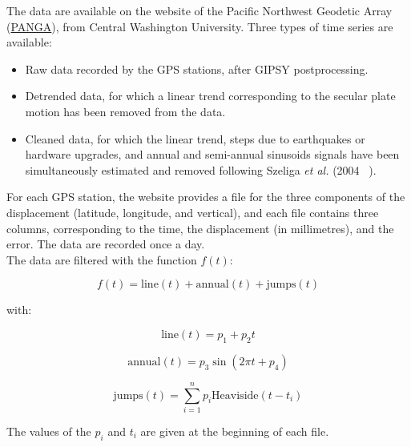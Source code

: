 \documentclass[main.tex]{subfiles}
\begin{document}
The data are available on the website of the Pacific Northwest Geodetic Array (\href{http://www.geodesy.cwu.edu/}{PANGA}), from Central Washington University. Three types of time series are available:

\begin{itemize}
\item Raw data recorded by the GPS stations, after GIPSY postprocessing.
\item Detrended data, for which a linear trend corresponding to the secular plate motion has been removed from the data.
\item Cleaned data, for which the linear trend, steps due to earthquakes or hardware upgrades, and annual and semi-annual sinusoids signals have been simultaneously estimated and removed following Szeliga \textit{et al.} (2004 ~\cite{SZE_2004}).
\end{itemize}

For each GPS station, the website provides a file for the three components of the displacement (latitude, longitude, and vertical), and each file contains three columns, corresponding to the time, the displacement (in millimetres), and the error. The data are recorded once a day. \\

The data are filtered with the function $f (t)$:

\begin{equation}
f (t) = \textrm{line} (t) + \textrm{annual} (t) + \textrm{jumps} (t)
\end{equation}

with:

\begin{equation}
\textrm{line} (t) = p_1 + p_2 t
\end{equation}

\begin{equation}
\textrm{annual} (t) = p_3 \sin (2 \pi t + p_4)
\end{equation}

\begin{equation}
\textrm{jumps} (t) = \sum_{i = 1}^{n} p_i \textrm{Heaviside} (t - t_i)
\end{equation}

The values of the $p_i$ and $t_i$ are given at the beginning of each file.
\end{document}
